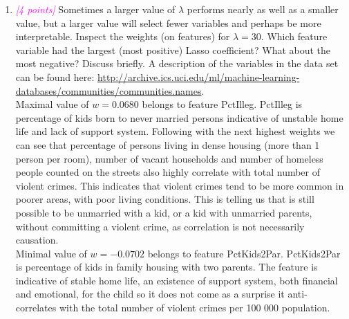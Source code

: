 \documentclass{article}
\newcommand{\1}{\mathbf{1}}
\newcommand{\points}[1]{\small\textcolor{magenta}{\emph{[#1 points]}} \normalsize}
\begin{document}
\begin{enumerate}
    \newpage
    \item \points{4} Sometimes a larger value of $\lambda$ performs nearly as well as a smaller value, but a larger value will select fewer variables and perhaps be more interpretable. Inspect the weights (on features) for $\lambda = 30$. Which feature variable had the largest (most positive) Lasso coefficient? What about the most negative? Discuss briefly. A description of the variables in the data set can be found here: \url{http://archive.ics.uci.edu/ml/machine-learning-databases/communities/communities.names}. \\
    
    Maximal value of $w=0.0680$ belongs to feature PctIlleg. PctIlleg is percentage of kids born to never married persons indicative of unstable home life and lack of support system. Following with the next highest weights we can see that percentage of persons living in dense housing (more than 1 person per room), number of vacant households and number of homeless people counted on the streets also highly correlate with total number of violent crimes. This indicates that violent crimes tend to be more common in poorer areas, with poor living conditions. This is telling us that is still possible to be unmarried with a kid, or a kid with unmarried parents, without committing a violent crime, as correlation is not necessarily causation.  \\
    Minimal value of $w=-0.0702$ belongs to feature PctKids2Par. PctKids2Par is percentage of kids in family housing with two parents. The feature is indicative of stable home life, an existence of support system, both financial and emotional, for the child so it does not come as a surprise it anti-correlates with the total number of violent crimes per 100 000 population. 


\end{enumerate}
\end{document}
